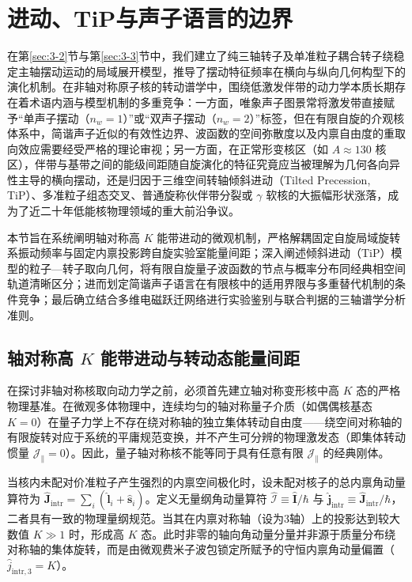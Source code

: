 \section{进动、TiP与声子语言的边界}\label{sec:3-4}

在第\ref{sec:3-2}节与第\ref{sec:3-3}节中，我们建立了纯三轴转子及单准粒子耦合转子绕稳定主轴摆动运动的局域展开模型，推导了摆动特征频率在横向与纵向几何构型下的演化机制。在非轴对称原子核的转动谱学中，围绕低激发伴带的动力学本质长期存在着术语内涵与模型机制的多重竞争：一方面，唯象声子图景常将激发带直接赋予“单声子摆动（$n_w=1$）”或“双声子摆动（$n_w=2$）”标签，但在有限自旋的介观核体系中，简谐声子近似的有效性边界、波函数的空间弥散度以及内禀自由度的重取向效应需要经受严格的理论审视；另一方面，在正常形变核区（如 $A \approx 130$ 核区），伴带与基带之间的能级间距随自旋演化的特征究竟应当被理解为几何各向异性主导的横向摆动，还是归因于三维空间转轴倾斜进动（Tilted Precession, TiP）、多准粒子组态交叉、普通旋称伙伴带分裂或 $\gamma$ 软核的大振幅形状涨落，成为了近二十年低能核物理领域的重大前沿争议。

本节旨在系统阐明轴对称高 $K$ 能带进动的微观机制，严格解耦固定自旋局域旋转系振动频率与固定内禀投影跨自旋实验室能量间距；深入阐述倾斜进动（TiP）模型的粒子—转子取向几何，将有限自旋量子波函数的节点与概率分布同经典相空间轨道清晰区分；进而划定简谐声子语言在有限核中的适用界限与多重替代机制的条件竞争；最后确立结合多维电磁跃迁网络进行实验鉴别与联合判据的三轴谱学分析准则。

\subsection{轴对称高 $K$ 能带进动与转动态能量间距}\label{sec:3-4-1}

在探讨非轴对称核取向动力学之前，必须首先建立轴对称变形核中高 $K$ 态的严格物理基准。在微观多体物理中，连续均匀的轴对称量子介质（如偶偶核基态 $K=0$）在量子力学上不存在绕对称轴的独立集体转动自由度——绕空间对称轴的有限旋转对应于系统的平庸规范变换，并不产生可分辨的物理激发态（即集体转动惯量 $\mathcal{J}_\parallel = 0$）。因此，量子轴对称核不能等同于具有任意有限 $\mathcal{J}_\parallel$ 的经典刚体。

当核内未配对价准粒子产生强烈的内禀空间极化时，设未配对核子的总内禀角动量算符为 $\hat{\mathbf{J}}_{\text{intr}} = \sum_i (\hat{\mathbf{l}}_i + \hat{\mathbf{s}}_i)$。定义无量纲角动量算符 $\hat{\boldsymbol{\mathcal{I}}} \equiv \hat{\mathbf{I}}/\hbar$ 与 $\hat{\mathbf{j}}_{\text{intr}} \equiv \hat{\mathbf{J}}_{\text{intr}}/\hbar$，二者具有一致的物理量纲规范。当其在内禀对称轴（设为3轴）上的投影达到较大数值 $K \gg 1$ 时，形成高 $K$ 态。此时非零的轴向角动量分量并非源于质量分布绕对称轴的集体旋转，而是由微观费米子波包锁定所赋予的守恒内禀角动量偏置（$\hat{j}_{\text{intr}, 3} = K$）。

